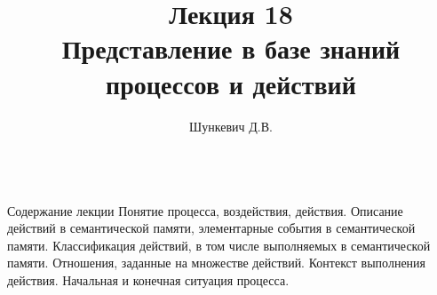 \title{Лекция 18\\Представление в базе знаний процессов и действий}
\author[]{Шункевич Д.В.}

\begin{frame}
	\titlepage
\end{frame}

\begin{frame}{\\Содержание лекции}
	\topline
	\justifying
	Понятие процесса, воздействия, действия. Описание действий в семантической памяти, элементарные события в семантической памяти. Классификация действий, в том числе выполняемых в семантической памяти. Отношения, заданные на множестве действий. Контекст выполнения действия. Начальная и конечная ситуация процесса. 
\end{frame}


